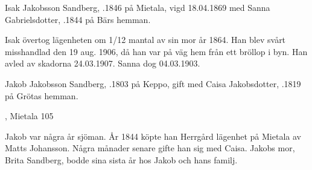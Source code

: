 %
Isak Jakobsson Sandberg, .1846 på Mietala, vigd 18.04.1869 med Sanna Gabrielsdotter, .1844 på Bärs hemman.
\begin{jhchildren}
  \item {}
  \item {}
  \item {}
  \item {}
  \item {}
  \item {}
  \item {}
\end{jhchildren}

Isak övertog lägenheten om 1/12 mantal av sin mor år 1864. Han blev svårt misshandlad den 19 aug. 1906, då han var på väg hem från ett bröllop i byn. Han avled av skadorna 24.03.1907. Sanna dog 04.03.1903.


%
Jakob Jakobsson Sandberg, .1803 på Keppo, gift med Caisa Jakobsdotter, .1819 på Grötas hemman.
\begin{jhchildren}
  \item {}
  \item {}
  \item {}
  \item {}, Mietala 105
  \item {}
  \item {}
\end{jhchildren}

Jakob var några år sjöman. År 1844 köpte han Herrgård lägenhet på Mietala av Matts Johansson. Några månader senare gifte han sig med Caisa. Jakobs mor, Brita Sandberg, bodde sina sista år hos Jakob och hans familj.

